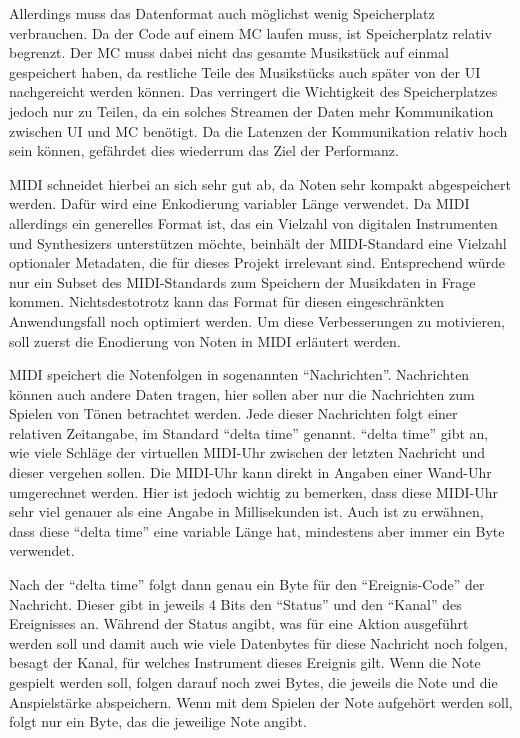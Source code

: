 Allerdings muss das Datenformat auch möglichst wenig Speicherplatz verbrauchen.
Da der Code auf einem \ac{MC} laufen muss, ist Speicherplatz relativ begrenzt.
Der \ac{MC} muss dabei nicht das gesamte Musikstück auf einmal gespeichert haben, da restliche Teile des Musikstücks auch später von der \ac{UI} nachgereicht werden können.
Das verringert die Wichtigkeit des Speicherplatzes jedoch nur zu Teilen, da ein solches Streamen der Daten mehr Kommunikation zwischen \ac{UI} und {MC} benötigt.
Da die Latenzen der Kommunikation relativ hoch sein können, gefährdet dies wiederrum das Ziel der Performanz.

\ac{MIDI} schneidet hierbei an sich sehr gut ab, da Noten sehr kompakt abgespeichert werden.
Dafür wird eine Enkodierung variabler Länge verwendet.
Da \ac{MIDI} allerdings ein generelles Format ist, das ein Vielzahl von digitalen Instrumenten und Synthesizers unterstützen möchte, beinhält der \ac{MIDI}-Standard eine Vielzahl optionaler Metadaten, die für dieses Projekt irrelevant sind.
Entsprechend würde nur ein Subset des \ac{MIDI}-Standards zum Speichern der Musikdaten in Frage kommen.
Nichtsdestotrotz kann das Format für diesen eingeschränkten Anwendungsfall noch optimiert werden.
Um diese Verbesserungen zu motivieren, soll zuerst die Enodierung von Noten in \ac{MIDI} erläutert werden.

\ac{MIDI} speichert die Notenfolgen in sogenannten \enquote{Nachrichten}.
Nachrichten können auch andere Daten tragen, hier sollen aber nur die Nachrichten zum Spielen von Tönen betrachtet werden.
Jede dieser Nachrichten folgt einer relativen Zeitangabe, im Standard \enquote{delta time} genannt.
\enquote{delta time} gibt an, wie viele Schläge der virtuellen \ac{MIDI}-Uhr zwischen der letzten Nachricht und dieser vergehen sollen.
Die \ac{MIDI}-Uhr kann direkt in Angaben einer Wand-Uhr umgerechnet werden.
Hier ist jedoch wichtig zu bemerken, dass diese \ac{MIDI}-Uhr sehr viel genauer als eine Angabe in Millisekunden ist.
Auch ist zu erwähnen, dass diese \enquote{delta time} eine variable Länge hat, mindestens aber immer ein Byte verwendet.

Nach der \enquote{delta time} folgt dann genau ein Byte für den \enquote{Ereignis-Code} der Nachricht.
Dieser gibt in jeweils 4 Bits den \enquote{Status} und den \enquote{Kanal} des Ereignisses an.
Während der Status angibt, was für eine Aktion ausgeführt werden soll und damit auch wie viele Datenbytes für diese Nachricht noch folgen, besagt der Kanal, für welches Instrument dieses Ereignis gilt.
Wenn die Note gespielt werden soll, folgen darauf noch zwei Bytes, die jeweils die Note und die Anspielstärke abspeichern.
Wenn mit dem Spielen der Note aufgehört werden soll, folgt nur ein Byte, das die jeweilige Note angibt.

